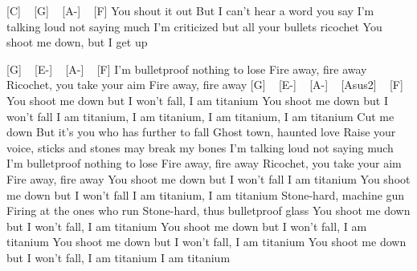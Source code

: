 

[C] ~ [G] ~ [A-] ~ [F]
You shout it out
But I can't hear a word you say
I'm talking loud not saying much
I'm criticized but all your bullets ricochet
You shoot me down, but I get up

[G] ~ [E-] ~ [A-] ~ [F]
I'm bulletproof nothing to lose
Fire away, fire away
Ricochet, you take your aim
Fire away, fire away
[G] ~ [E-] ~ [A-] ~ [Asus2] ~ [F]
You shoot me down but I won't fall, I am titanium
You shoot me down but I won't fall
I am titanium, I am titanium, I am titanium, I am titanium
Cut me down
But it's you who has further to fall
Ghost town, haunted love
Raise your voice, sticks and stones may break my bones
I'm talking loud not saying much
I'm bulletproof nothing to lose
Fire away, fire away
Ricochet, you take your aim
Fire away, fire away
You shoot me down but I won't fall
I am titanium
You shoot me down but I won't fall
I am titanium, I am titanium
Stone-hard, machine gun
Firing at the ones who run
Stone-hard, thus bulletproof glass
You shoot me down but I won't fall, I am titanium
You shoot me down but I won't fall, I am titanium
You shoot me down but I won't fall, I am titanium
You shoot me down but I won't fall, I am titanium
I am titanium